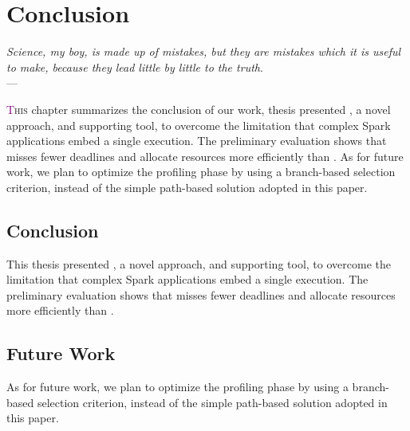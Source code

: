 \chapter{Conclusion} \label{chap:conclusion}
\begin{flushright}{\slshape    
   Science, my boy, is made up of mistakes, but they are mistakes
   which it is useful to make, because they lead little by little
   to the truth}. \\ \medskip --- \citeauthor{verne_journey:1957}
    \citeyear{verne_journey:1957}
\end{flushright} 
\lettrine[lines=4]{\textcolor{purple}{T}}{his} chapter summarizes the conclusion of our work, thesis presented \dSymb, a novel approach, and supporting tool, to overcome the limitation that complex Spark applications embed a single execution. The preliminary evaluation shows that \tool misses fewer deadlines and allocate resources more efficiently than \cSpark. As for future work, we plan to optimize the profiling phase by using a branch-based selection criterion, instead of the simple path-based solution adopted in this paper.

\section{Conclusion}\label{sec:conclusion}
This thesis presented \dSymb, a novel approach, and supporting tool, to overcome the limitation that complex Spark applications embed a single execution. The preliminary evaluation shows that \tool misses fewer deadlines and allocate resources more efficiently than \cSpark. 

\section{Future Work}\label{sec:future_work}
As for future work, we plan to optimize the profiling phase by using a branch-based selection criterion, instead of the simple path-based solution adopted in this paper.